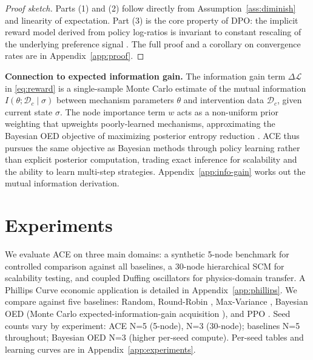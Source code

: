 \documentclass{article}
\theoremstyle{plain}
\theoremstyle{definition}
\theoremstyle{remark}
\begin{document}
\begin{proof}[Proof sketch]
Parts (1) and (2) follow directly from Assumption~\ref{ass:diminish} and linearity of expectation. Part (3) is the core property of DPO: the implicit reward model derived from policy log-ratios is invariant to constant rescaling of the underlying preference signal \citep{rafailov2023direct}. The full proof and a corollary on convergence rates are in Appendix~\ref{app:proof}.
\end{proof}

\textbf{Connection to expected information gain.} The information gain term $\Delta\mathcal{L}$ in \eqref{eq:reward} is a single-sample Monte Carlo estimate of the mutual information $I(\theta; \mathcal{D}_c \mid \sigma)$ between mechanism parameters $\theta$ and intervention data $\mathcal{D}_c$, given current state $\sigma$. The node importance term $w$ acts as a non-uniform prior weighting that upweights poorly-learned mechanisms, approximating the Bayesian OED objective of maximizing posterior entropy reduction \citep{toth2022active}. ACE thus pursues the same objective as Bayesian methods through policy learning rather than explicit posterior computation, trading exact inference for scalability and the ability to learn multi-step strategies. Appendix~\ref{app:info-gain} works out the mutual information derivation.

\section{Experiments}
\label{sec:results}

We evaluate ACE on three main domains: a synthetic 5-node benchmark for controlled comparison against all baselines, a 30-node hierarchical SCM for scalability testing, and coupled Duffing oscillators for physics-domain transfer. A Phillips Curve economic application is detailed in Appendix~\ref{app:phillips}. We compare against five baselines: Random, Round-Robin \citep{fisher1935design}, Max-Variance \citep{cohn1996active,gal2016dropout}, Bayesian OED (Monte Carlo expected-information-gain acquisition \citep{toth2022active,tigas2022interventions}), and PPO \citep{schulman2017proximal}. Seed counts vary by experiment: ACE N=5 (5-node), N=3 (30-node); baselines N=5 throughout; Bayesian OED N=3 (higher per-seed compute). Per-seed tables and learning curves are in Appendix~\ref{app:experiments}.
\end{document}
